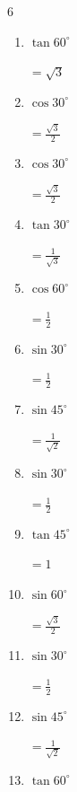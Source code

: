 \begin{multicols}{6}
\begin{enumerate}
        $\displaystyle =\frac{1}{\sqrt{2}}$

  \item $\displaystyle \tan{60^\circ}$

        $\displaystyle =\sqrt{3}$

  \item $\displaystyle \cos{30^\circ}$

        $\displaystyle =\frac{\sqrt{3}}{2}$

  \item $\displaystyle \cos{30^\circ}$

        $\displaystyle =\frac{\sqrt{3}}{2}$

  \item $\displaystyle \tan{30^\circ}$

        $\displaystyle =\frac{1}{\sqrt{3}}$

  \item $\displaystyle \cos{60^\circ}$

        $\displaystyle =\frac{1}{2}$

  \item $\displaystyle \sin{30^\circ}$

        $\displaystyle =\frac{1}{2}$

  \item $\displaystyle \sin{45^\circ}$

        $\displaystyle =\frac{1}{\sqrt{2}}$

  \item $\displaystyle \sin{30^\circ}$

        $\displaystyle =\frac{1}{2}$

  \item $\displaystyle \tan{45^\circ}$

        $\displaystyle =1$

  \item $\displaystyle \sin{60^\circ}$

        $\displaystyle =\frac{\sqrt{3}}{2}$

  \item $\displaystyle \sin{30^\circ}$

        $\displaystyle =\frac{1}{2}$

\columnbreak %

  \item $\displaystyle \sin{45^\circ}$

        $\displaystyle =\frac{1}{\sqrt{2}}$

  \item $\displaystyle \tan{60^\circ}$


\end{enumerate}
\end{multicols}
